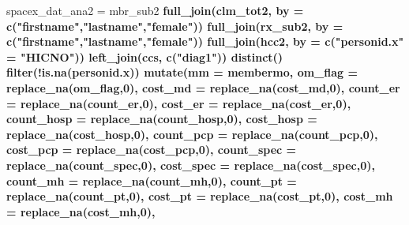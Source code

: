 \documentclass[]{article}
\newenvironment{Shaded}{\begin{snugshade}}{\end{snugshade}}
\newcommand{\KeywordTok}[1]{\textcolor[rgb]{0.13,0.29,0.53}{\textbf{#1}}}
\newcommand{\DataTypeTok}[1]{\textcolor[rgb]{0.13,0.29,0.53}{#1}}
\newcommand{\DecValTok}[1]{\textcolor[rgb]{0.00,0.00,0.81}{#1}}
\newcommand{\StringTok}[1]{\textcolor[rgb]{0.31,0.60,0.02}{#1}}
\newcommand{\OperatorTok}[1]{\textcolor[rgb]{0.81,0.36,0.00}{\textbf{#1}}}
\newcommand{\NormalTok}[1]{#1}
\begin{document}
\begin{Shaded}
\begin{Highlighting}[]
{{{{{{{{{{{{{{{{{{{{{{{{{{{{{{{{{{\NormalTok{spacex_dat_ana2 =}\StringTok{ }\NormalTok{mbr_sub2 }\OperatorTok{%>%}\StringTok{ }
\StringTok{  }\KeywordTok{full_join}\NormalTok{(clm_tot2, }\DataTypeTok{by =} \KeywordTok{c}\NormalTok{(}\StringTok{"firstname"}\NormalTok{,}\StringTok{"lastname"}\NormalTok{,}\StringTok{"female"}\NormalTok{)) }\OperatorTok{%>%}
\StringTok{  }\KeywordTok{full_join}\NormalTok{(rx_sub2, }\DataTypeTok{by =} \KeywordTok{c}\NormalTok{(}\StringTok{"firstname"}\NormalTok{,}\StringTok{"lastname"}\NormalTok{,}\StringTok{"female"}\NormalTok{)) }\OperatorTok{%>%}
\StringTok{  }\KeywordTok{full_join}\NormalTok{(hcc2, }\DataTypeTok{by =} \KeywordTok{c}\NormalTok{(}\StringTok{"personid.x"}\NormalTok{ =}\StringTok{ "HICNO"}\NormalTok{)) }\OperatorTok{%>%}
\StringTok{  }\KeywordTok{left_join}\NormalTok{(ccs, }\KeywordTok{c}\NormalTok{(}\StringTok{"diag1"}\NormalTok{)) }\OperatorTok{%>%}
\StringTok{  }\KeywordTok{distinct}\NormalTok{() }\OperatorTok{%>%}
\StringTok{  }\KeywordTok{filter}\NormalTok{(}\OperatorTok{!}\KeywordTok{is.na}\NormalTok{(personid.x)) }\OperatorTok{%>%}
\StringTok{  }\KeywordTok{mutate}\NormalTok{(}\DataTypeTok{mm =}\NormalTok{ membermo,}
         \DataTypeTok{om_flag =} \KeywordTok{replace_na}\NormalTok{(om_flag,}\DecValTok{0}\NormalTok{),}
         \DataTypeTok{cost_md =} \KeywordTok{replace_na}\NormalTok{(cost_md,}\DecValTok{0}\NormalTok{),}
         \DataTypeTok{count_er =} \KeywordTok{replace_na}\NormalTok{(count_er,}\DecValTok{0}\NormalTok{),}
         \DataTypeTok{cost_er =} \KeywordTok{replace_na}\NormalTok{(cost_er,}\DecValTok{0}\NormalTok{),}
         \DataTypeTok{count_hosp =} \KeywordTok{replace_na}\NormalTok{(count_hosp,}\DecValTok{0}\NormalTok{),}
         \DataTypeTok{cost_hosp =} \KeywordTok{replace_na}\NormalTok{(cost_hosp,}\DecValTok{0}\NormalTok{),}
         \DataTypeTok{count_pcp =} \KeywordTok{replace_na}\NormalTok{(count_pcp,}\DecValTok{0}\NormalTok{),}
         \DataTypeTok{cost_pcp =} \KeywordTok{replace_na}\NormalTok{(cost_pcp,}\DecValTok{0}\NormalTok{),}
         \DataTypeTok{count_spec =} \KeywordTok{replace_na}\NormalTok{(count_spec,}\DecValTok{0}\NormalTok{),}
         \DataTypeTok{cost_spec =} \KeywordTok{replace_na}\NormalTok{(cost_spec,}\DecValTok{0}\NormalTok{),}
         \DataTypeTok{count_mh =} \KeywordTok{replace_na}\NormalTok{(count_mh,}\DecValTok{0}\NormalTok{),}
         \DataTypeTok{count_pt =} \KeywordTok{replace_na}\NormalTok{(count_pt,}\DecValTok{0}\NormalTok{),}
         \DataTypeTok{cost_pt =} \KeywordTok{replace_na}\NormalTok{(cost_pt,}\DecValTok{0}\NormalTok{),}
         \DataTypeTok{cost_mh =} \KeywordTok{replace_na}\NormalTok{(cost_mh,}\DecValTok{0}\NormalTok{),}
}}}}}}}}}}}}}}}}}}}}}}}}}}}}}}}}}}}}}}}}}
\end{Highlighting}
\end{Shaded}
\end{document}
